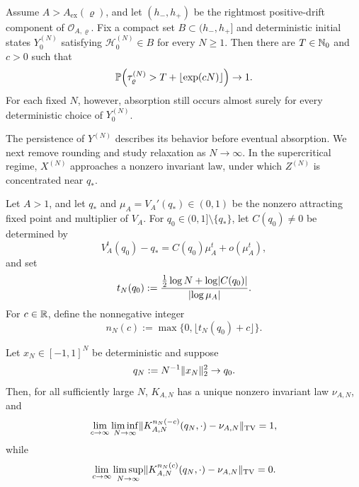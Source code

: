 \documentclass[11pt,reqno,a4paper]{article}
\newcommand{\Pp}{\P}
\newcommand{\TV}{\mathrm{TV}}
\begin{document}
\begin{theorem}[Metastability]
\label{thm:rounded-qualitative-metastability:intro}
  Assume $A>A_{\mathrm{ex}}(\varrho)$, and let $(h_-,h_+)$ be the
  rightmost positive-drift component of $\mathcal O_{A,\varrho}$. Fix a
  compact set $B\subset(h_-,h_+]$ and deterministic initial states
  $Y_0^{(N)}$ satisfying $\mathscr H_0^{(N)}\in B$ for every $N\geq1$.
  Then there are
  $T\in\mathbb{N}_0$ and $c>0$ such that
  \begin{equation*}
    \Pp\left(
      \tau_\varrho^{(N)}
      >
      T+\lfloor\exp(cN)\rfloor
    \right)
    \to1 .
  \end{equation*}
  For each fixed $N$, however, absorption still occurs almost surely for every
  deterministic choice of $Y_0^{(N)}$.
\end{theorem}

The persistence of $Y^{(N)}$ describes its behavior before eventual
absorption. We next remove rounding and study relaxation as $N\to\infty$. In
the supercritical regime, $X^{(N)}$ approaches a nonzero invariant law, under
which $Z^{(N)}$ is concentrated near $q_\ast$.

Let $A>1$, and let $q_\ast$ and $\mu_A=V_A'(q_\ast)\in(0,1)$ be the nonzero
attracting fixed point and multiplier of $V_A$. For
$q_0\in(0,1]\setminus\{q_\ast\}$, let $C(q_0)\neq0$ be determined by
\begin{equation*}
  V_A^t(q_0)-q_\ast=C(q_0)\mu_A^t+o(\mu_A^t),
\end{equation*}
and set
\begin{equation}\label{eq:gaussian-cutoff-time}
  t_N(q_0)
  :=
  \frac{\frac12\log N+\log\abs{C(q_0)}}{\abs{\log\mu_A}}.
\end{equation}
For $c\in\mathbb{R}$, define the nonnegative integer
\begin{equation}\label{eq:gaussian-integer-cutoff-time}
  n_N(c):=\max\{0,\lfloor t_N(q_0)+c\rfloor\} .
\end{equation}

\begin{theorem}
\label{thm:gaussian-process-cutoff}
  Let $x_N\in[-1,1]^N$ be deterministic and suppose
  \begin{equation*}
    q_N:=N^{-1}\lVert x_N\rVert_2^2
    \to
    q_0.
  \end{equation*}
  Then, for all sufficiently large $N$, $K_{A,N}$ has a
  unique nonzero invariant law $\nu_{A,N}$, and
  \begin{equation}\label{eq:gaussian-process-lower}
    \lim_{c\to\infty}\liminf_{N\to\infty}
    \norm{K_{A,N}^{n_N(-c)}(q_N,\cdot)-\nu_{A,N}}_{\TV}
    =1,
  \end{equation}
  while
  \begin{equation}\label{eq:gaussian-process-upper}
    \lim_{c\to\infty}\limsup_{N\to\infty}
    \norm{K_{A,N}^{n_N(c)}(q_N,\cdot)-\nu_{A,N}}_{\TV}
    =0.
  \end{equation}
\end{theorem}
\end{document}
